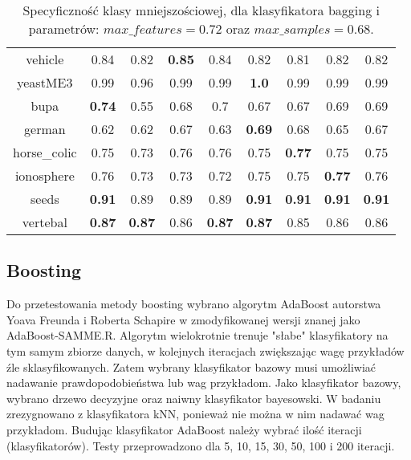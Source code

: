 \begin{table}[H]
\begin{center}
{\begin{tabular}{c|cccccccc}
				vehicle&0.84&0.82&\textbf{0.85}&0.84&0.82&0.81&0.82&0.82\\%

				yeastME3&0.99&0.96&0.99&0.99&\textbf{1.0}&0.99&0.99&0.99\\%

				bupa&\textbf{0.74}&0.55&0.68&0.7&0.67&0.67&0.69&0.69\\%

				german&0.62&0.62&0.67&0.63&\textbf{0.69}&0.68&0.65&0.67\\%

				horse\_colic&0.75&0.73&0.76&0.76&0.75&\textbf{0.77}&0.75&0.75\\%

				ionosphere&0.76&0.73&0.73&0.72&0.75&0.75&\textbf{0.77}&0.76\\%

				seeds&\textbf{0.91}&0.89&0.89&0.89&\textbf{0.91}&\textbf{0.91}&\textbf{0.91}&\textbf{0.91}\\%

				vertebal&\textbf{0.87}&\textbf{0.87}&0.86&\textbf{0.87}&\textbf{0.87}&0.85&0.86&0.86\\%
				\hline%
			\end{tabular}}
			\caption{Specyficzność klasy mniejszościowej, dla klasyfikatora bagging i parametrów: $max\_features = 0.72$ oraz $max\_samples = 0.68$.}
			\label{baggin_spec2}
		\end{center}
	\end{table}
\subsection{Boosting}
Do przetestowania metody boosting wybrano algorytm AdaBoost autorstwa Yoava Freunda i Roberta Schapire w zmodyfikowanej wersji znanej jako AdaBoost-SAMME.R. Algorytm wielokrotnie trenuje "słabe" klasyfikatory na tym samym zbiorze danych, w kolejnych iteracjach zwiększając wagę przykładów źle sklasyfikowanych. Zatem wybrany klasyfikator bazowy musi umożliwiać nadawanie prawdopodobieństwa lub wag przykładom. Jako klasyfikator bazowy, wybrano drzewo decyzyjne oraz naiwny klasyfikator bayesowski. W badaniu zrezygnowano z klasyfikatora kNN, ponieważ nie można w nim nadawać wag przykładom. Budując klasyfikator AdaBoost należy wybrać ilość iteracji (klasyfikatorów). Testy przeprowadzono dla 5, 10, 15, 30, 50, 100 i 200 iteracji.


